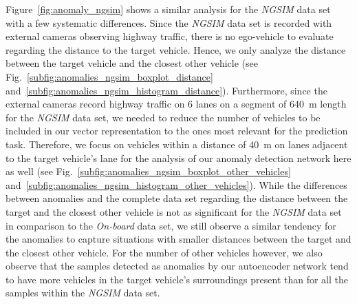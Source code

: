 Figure~\ref{fig:anomaly_ngsim} shows a similar analysis for the \emph{\ac{NGSIM}} data set with a few systematic differences.
Since the \emph{\ac{NGSIM}} data set is recorded with external cameras observing highway traffic, there is no ego-vehicle to evaluate regarding the distance to the target vehicle.
Hence, we only analyze the distance between the target vehicle and the closest other vehicle (see Fig.~\ref{subfig:anomalies_ngsim_boxplot_distance} and~\ref{subfig:anomalies_ngsim_histogram_distance}).
Furthermore, since the external cameras record highway traffic on \num{6} lanes on a segment of \SI{640}{\meter} length for the \emph{\ac{NGSIM}} data set, we needed to reduce the number of vehicles to be included in our vector representation to the ones most relevant for the prediction task.
Therefore, we focus on vehicles within a distance of \SI{40}{\meter} on lanes adjacent to the target vehicle's lane for the analysis of our anomaly detection network here as well (see Fig.~\ref{subfig:anomalies_ngsim_boxplot_other_vehicles} and~\ref{subfig:anomalies_ngsim_histogram_other_vehicles}).
While the differences between anomalies and the complete data set regarding the distance between the target and the closest other vehicle is not as significant for the \emph{\ac{NGSIM}} data set in comparison to the \emph{On-board} data set, we still observe a similar tendency for the anomalies to capture situations with smaller distances between the target and the closest other vehicle.
For the number of other vehicles however, we also observe that the samples detected as anomalies by our autoencoder network tend to have more vehicles in the target vehicle's surroundings present than for all the samples within the \emph{\ac{NGSIM}} data set.

